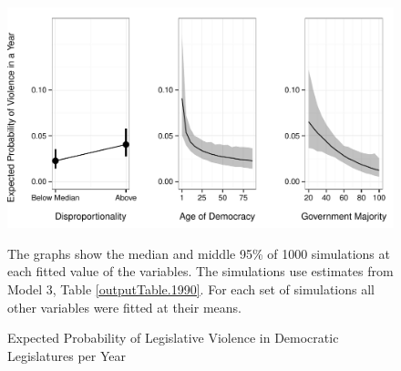 \documentclass[a4paper]{article}\usepackage[]{graphicx}\usepackage[]{color}
\newenvironment{knitrout}{}{} %
\begin{document}
\begin{figure}[t]
    \begin{center}

\begin{knitrout}
\color{fgcolor}
\includegraphics[width=0.95\linewidth]{figure/predProb-1} 

\end{knitrout}
    \end{center}
    \caption{Expected Probability of Legislative Violence in Democratic Legislatures per Year}
    \label{pred_prob}
    \begin{singlespace}
      {\scriptsize{The graphs show the median and middle 95\% of 1000 simulations at each fitted value of the variables. The simulations use estimates from Model 3, Table \ref{outputTable.1990}. For each set of simulations all other variables were fitted at their means.}}
    \end{singlespace}
\end{figure}
\end{document}
